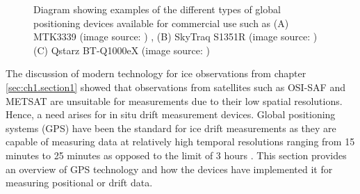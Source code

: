 \begin{figure}[H]
	\centering
	\begin{subfigure}[t]{.3\textwidth}
	\end{subfigure}
	\hfill
	\begin{subfigure}[t]{.3\textwidth}
	\end{subfigure}
	\hfill
	\begin{subfigure}[t]{.3\textwidth}
	\end{subfigure}
	\hfill
	\label{fig:device_gps}
	\caption{Diagram showing examples of the different types of global positioning devices available for commercial use such as (A) MTK3339 (image source: \cite{mtk3339}) , (B) SkyTraq S1351R (image source: \cite{s1315F}) (C) Qstarz BT-Q1000eX (image source: \cite{BTQ1000EX})  }
\end{figure}
The discussion of modern technology for ice observations from chapter \ref{sec:ch1.section1} showed that observations from satellites such as OSI-SAF and METSAT are unsuitable for measurements \cite{lepparanta2001sea,galin2011validation} due to their low spatial resolutions. Hence, a need arises for in situ drift measurement devices. Global positioning systems (GPS) have been the standard for ice drift measurements \cite{lepparanta2001sea} as they are capable of measuring data at relatively high temporal resolutions ranging from 15 minutes \cite{alberello2019drift} to 25 minutes \cite{rabault2019open} as opposed to the limit of 3 hours \cite{alberello2019drift}. This section provides an overview of GPS technology and how the devices have implemented it for measuring positional or drift data.

